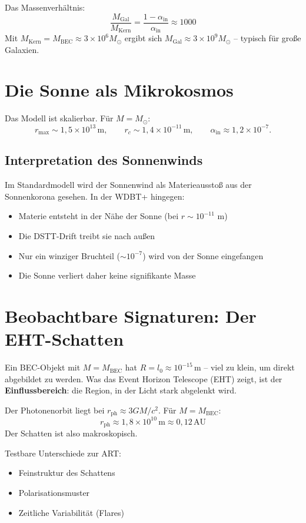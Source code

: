 \documentclass[12pt,a4paper]{article}
\begin{document}
Das Massenverhältnis:
\[
\frac{M_{\text{Gal}}}{M_{\text{Kern}}} = \frac{1 - \alpha_{\text{in}}}{\alpha_{\text{in}}} \approx 1000
\]
Mit $M_{\text{Kern}} = M_{\text{BEC}} \approx 3 \times 10^6 M_\odot$ ergibt sich $M_{\text{Gal}} \approx 3 \times 10^9 M_\odot$ – typisch für große Galaxien.

\section{Die Sonne als Mikrokosmos}

Das Modell ist skalierbar. Für $M = M_\odot$:
\[
r_{\text{max}} \sim 1{,}5 \times 10^{13}\,\text{m},\qquad
r_c \sim 1{,}4 \times 10^{-11}\,\text{m},\qquad
\alpha_{\text{in}} \approx 1{,}2 \times 10^{-7}.
\]

\subsection{Interpretation des Sonnenwinds}

Im Standardmodell wird der Sonnenwind als Materieausstoß aus der Sonnenkorona gesehen. In der WDBT+ hingegen:
\begin{itemize}
\item Materie entsteht in der Nähe der Sonne (bei $r \sim 10^{-11}$ m)
\item Die DSTT-Drift treibt sie nach außen
\item Nur ein winziger Bruchteil ($\sim 10^{-7}$) wird von der Sonne eingefangen
\item Die Sonne verliert daher keine signifikante Masse
\end{itemize}

\section{Beobachtbare Signaturen: Der EHT-Schatten}

Ein BEC-Objekt mit $M = M_{\text{BEC}}$ hat $R = l_0 \approx 10^{-15}\,\text{m}$ – viel zu klein, um direkt abgebildet zu werden. Was das Event Horizon Telescope (EHT) zeigt, ist der \textbf{Einflussbereich}: die Region, in der Licht stark abgelenkt wird.

Der Photonenorbit liegt bei $r_{\text{ph}} \approx 3GM/c^2$. Für $M = M_{\text{BEC}}$:
\[
r_{\text{ph}} \approx 1{,}8 \times 10^{10}\,\text{m} \approx 0{,}12\,\text{AU}
\]
Der Schatten ist also makroskopisch.

Testbare Unterschiede zur ART:
\begin{itemize}
\item Feinstruktur des Schattens
\item Polarisationsmuster
\item Zeitliche Variabilität (Flares)
\end{itemize}
\end{document}
